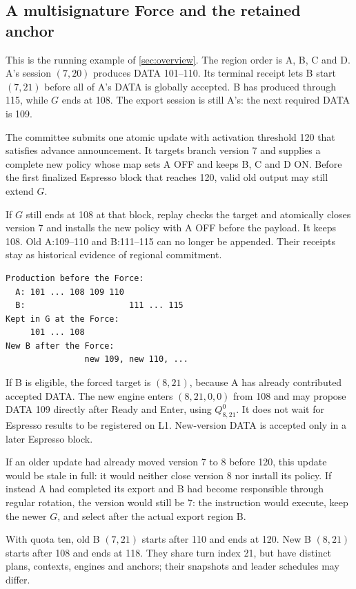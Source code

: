\documentclass[11pt,a4paper]{article}
\begin{document}
\subsection{A multisignature Force and the retained anchor}
\label{sec:force-example}
This is the running example of \cref{sec:overview}. The region order is
A, B, C and D. A's session $(7,20)$ produces DATA 101--110. Its terminal receipt
lets B start $(7,21)$ before all of A's DATA is globally accepted. B has
produced through 115, while $G$ ends at 108. The export session is still
A's: the next required DATA is 109.

The committee submits one atomic update with activation threshold 120
that satisfies advance announcement. It targets branch version 7 and
supplies a complete new policy whose map sets A OFF and keeps B, C and D ON.
Before the first finalized Espresso block that
reaches 120, valid old output may still extend $G$.

If $G$ still ends at 108 at that block, replay checks the target and
atomically closes version 7 and installs the new policy with A OFF before
the payload. It keeps 108. Old
A:109--110 and B:111--115 can no longer be appended. Their receipts stay
as historical evidence of regional commitment.

\begin{center}\small
\begin{verbatim}
Production before the Force:
  A: 101 ... 108 109 110
  B:                     111 ... 115
Kept in G at the Force:
     101 ... 108
New B after the Force:
                new 109, new 110, ...
\end{verbatim}
\end{center}

If B is eligible, the forced target is $(8,21)$, because A has already
contributed accepted DATA. The new engine enters $(8,21,0,0)$ from 108 and
may propose DATA 109 directly after Ready and Enter, using $Q^0_{8,21}$. It does not
wait for Espresso results to be registered on L1. New-version DATA is
accepted only in a later Espresso block.

If an older update had already moved version 7 to 8 before 120, this
update would be stale in full: it would neither close version 8 nor
install its policy. If instead A had completed its export and B had become
responsible through regular rotation, the version would still be 7: the
instruction would execute, keep the newer $G$, and select after the
actual export region B.

With quota ten, old B $(7,21)$ starts after 110 and ends at 120. New B
$(8,21)$ starts after 108 and ends at 118. They share turn index 21, but
have distinct plans, contexts, engines and anchors; their snapshots and
leader schedules may differ.
\end{document}
